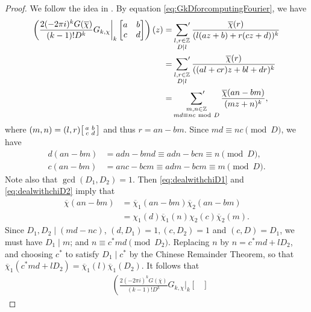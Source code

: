 \documentclass[11pt,letterpaper,reqno]{amsart}
\newcommand\ques[1]{\textcolor{blue}{\textbf{Question}: #1}}
\numberwithin{figure}{section}
\numberwithin{table}{section}
\theoremstyle{definition}
\theoremstyle{plain}
\theoremstyle{definition}
\theoremstyle{definition}
\theoremstyle{remark}
\numberwithin{equation}{section}
\theoremstyle{remark}
\begin{document}
\begin{proof}
     We follow the idea in \cite[pp.~273-275]{GZ-86}.   By equation \eqref{eq:GkDforcomputingFourier}, we have %
    \begin{align}
    \left(\frac{2(-2\pi i)^kG(\overline{\chi})}{(k-1)!D^k}G_{k,\chi}\bigg|_k\begin{bmatrix}
        a&b\\ c&d\end{bmatrix}\right)(z)&=\sideset{}{'}\sum_{\substack{l,r\in\mathbb{Z}\\D\mid l}}\frac{\overline{\chi}(r)}{(l(az+b)+r(cz+d))^k}   \nonumber\\&=\sideset{}{'}\sum_{\substack{l,r\in\mathbb{Z}\\D\mid l}}\frac{\overline{\chi}(r)}{((al+cr)z+bl+dr)^k}   \nonumber\\&=\sideset{}{'}\sum_{\substack{m,n\in\mathbb{Z} \\md\equiv nc~\text{mod}~D}}\frac{\overline{\chi}(an-bm)}{(mz+n)^k},   \nonumber
    \end{align}
    where $(m,n)=(l,r)\begin{bsmallmatrix}
        a&b\\ c&d\end{bsmallmatrix}$ and thus $r=an-bm$. Since $md\equiv nc\pmod{D}$, we have 
        \begin{align}
            d(an-bm)&=adn-bmd\equiv adn-bcn\equiv n\pmod{D},\label{eq:dealwithchiD1}\\ c(an-bm)&=anc-bcm\equiv adm-bcm\equiv m\pmod{D}.\label{eq:dealwithchiD2}
        \end{align}
Note also that $\gcd(D_1,D_2)=1$. Then \eqref{eq:dealwithchiD1} and \eqref{eq:dealwithchiD2} imply that
 \begin{align}
     \overline{\chi}(an-bm)&=\overline{\chi}_{1}(an-bm)\overline{\chi}_{2}(an-bm)   \nonumber\\&=\chi_{1}(d)\overline{\chi}_{1}(n)\chi_{2}(c)\overline{\chi}_{2}(m).   \nonumber
 \end{align}
 Since $D_1,D_2\mid(md-nc)$, $(d,D_1)=1, (c,D_2)=1$ and $(c,D)=D_1$, we must have $D_1\mid m$; and $n\equiv c^{\ast}md\pmod{D_2}$. Replacing $n$ by $n=c^{\ast}md+lD_2$, and choosing  $c^{\ast}$ to satisfy $D_1\mid c^{\ast}$ by the Chinese Remainder Theorem, so that $\overline{\chi}_1(c^{\ast}md+lD_2)=\overline{\chi}_1(l)\overline{\chi}_1(D_2)$. It follows that
 \begin{align}
 &\left(\frac{2(-2\pi i)^kG(\overline{\chi})}{(k-1)!D^k}G_{k,\chi}\bigg|_k\begin{bmatrix}

\end{bmatrix}
\end{align}
\end{proof}
\end{document}
